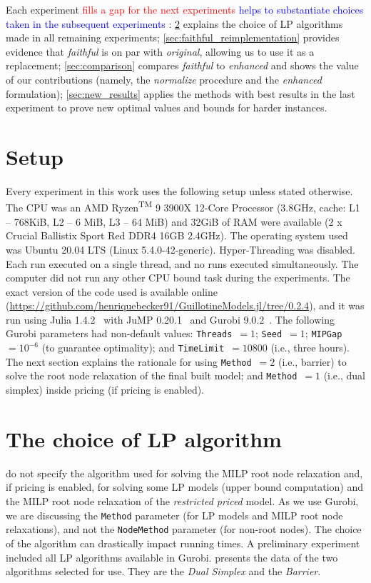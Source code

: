 \documentclass[ppgc,tese,english,formais,babel]{iiufrgs}
\newif\iffinalversion
\newcommand{\newtext}[1]{\iffinalversion%
#1%
\else%
\textcolor{blue}{#1}%
\fi%
}
\newcommand{\oldtext}[1]{\iffinalversion%
\else%
\textcolor{red}{#1}%
\fi%
}
\begin{document}
Each experiment \oldtext{fills a gap for the next experiments}\newtext{helps to substantiate choices taken in the subsequent experiments}:
\cref{sec:lp_method} explains the choice of LP algorithms made in all remaining experiments;
\cref{sec:faithful_reimplementation} provides evidence that \emph{faithful} is on par with \emph{original}, allowing us to use it as a replacement;
\cref{sec:comparison} compares \emph{faithful} to \emph{enhanced} and shows the value of our contributions (namely, the \emph{normalize} procedure and the \emph{enhanced} formulation);
\cref{sec:new_results} applies the methods with best results in the last experiment to prove new optimal values and bounds for harder instances.

\section{Setup}
\label{sec:setup}

Every experiment in this work uses the following setup unless stated otherwise.
The CPU was an AMD\textsuperscript{\textregistered} Ryzen\textsuperscript{TM} 9 3900X 12-Core Processor (3.8GHz, cache: L1 -- 768KiB, L2 -- 6 MiB, L3 -- 64 MiB) and 32GiB of RAM were available (2 x Crucial Ballistix Sport Red DDR4 16GB 2.4GHz).
The operating system used was Ubuntu 20.04 LTS (Linux 5.4.0-42-generic).
Hyper-Threading was disabled.
Each run executed on a single thread, and no runs executed simultaneously.
The computer did not run any other CPU bound task during the experiments.
The exact version of the code used is available online (\url{https://github.com/henriquebecker91/GuillotineModels.jl/tree/0.2.4}), and it was run using Julia 1.4.2~\citep{julia} with JuMP 0.20.1~\citep{JuMP} and Gurobi 9.0.2~\citep{gurobi}.
The following Gurobi parameters had non-default values: \verb+Threads+~\(= 1\); \verb+Seed+~\(= 1\); \verb+MIPGap+~\(= 10^{-6}\) (to guarantee optimality); and \verb+TimeLimit+~\(= 10800\) (i.e., three hours).
The next section explains the rationale for using \verb+Method+~\(= 2\) (i.e., barrier) to solve the root node relaxation of the final built model; and \verb+Method+~\(= 1\) (i.e., dual simplex) inside pricing (if pricing is enabled).

\section{The choice of LP algorithm}
\label{sec:lp_method}

\citet{dimitri_thesis} do not specify the algorithm used for solving the MILP root node relaxation and, if pricing is enabled, for solving some LP models (upper bound computation) and the MILP root node relaxation of the \emph{restricted priced} model.
As we use Gurobi, we are discussing the \verb+Method+ parameter (for LP models and MILP root node relaxations), and not the \verb+NodeMethod+ parameter (for non-root nodes).
The choice of the algorithm can drastically impact running times.
A preliminary experiment included all LP algorithms available in Gurobi.
 presents the data of the two algorithms selected for use.
They are the \emph{Dual Simplex} and the \emph{Barrier}.
\end{document}
